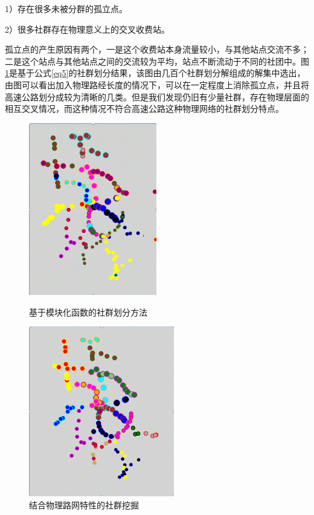 		1）存在很多未被分群的孤立点。

		2）很多社群存在物理意义上的交叉收费站。

		孤立点的产生原因有两个，一是这个收费站本身流量较小，与其他站点交流不多；二是这个站点与其他站点之间的交流较为平均，站点不断流动于不同的社团中。图\ref{fenqun2}是基于公式\ref{eq5}的社群划分结果，该图由几百个社群划分解组成的解集中选出，由图可以看出加入物理路经长度的情况下，可以在一定程度上消除孤立点，并且将高速公路划分成较为清晰的几类。但是我们发现仍旧有少量社群，存在物理层面的相互交叉情况，而这种情况不符合高速公路这种物理网络的社群划分特点。

				\begin{figure}
				\begin{minipage}{0.5\linewidth}
					\centering
					\includegraphics[width=2.2in]{picture/liuliangbianquan}
					\caption{基于模块化函数的社群划分方法}
					\label{fenqun1}
				\end{minipage}%
				\begin{minipage}{0.5\linewidth}
					\centering
					\includegraphics[width=2.5in]{picture/xiaochuguli}
					\caption{结合物理路网特性的社群挖掘}
					\label{fenqun2}
				\end{minipage}
				\end{figure}

